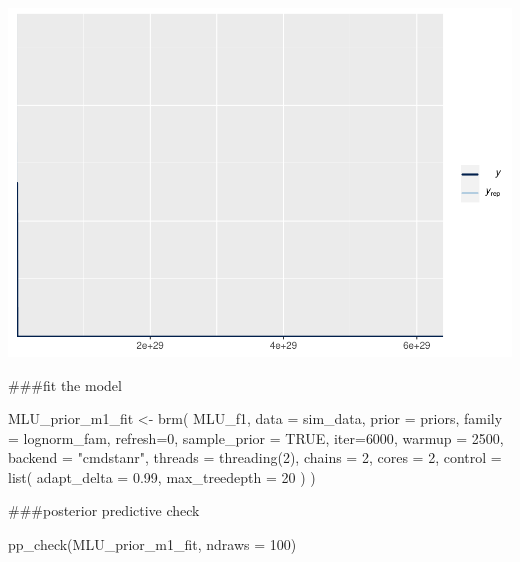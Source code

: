 \documentclass[
]{article}
\newenvironment{Shaded}{\begin{snugshade}}{\end{snugshade}}
\newcommand{\AttributeTok}[1]{\textcolor[rgb]{0.77,0.63,0.00}{#1}}
\newcommand{\ConstantTok}[1]{\textcolor[rgb]{0.00,0.00,0.00}{#1}}
\newcommand{\DecValTok}[1]{\textcolor[rgb]{0.00,0.00,0.81}{#1}}
\newcommand{\FloatTok}[1]{\textcolor[rgb]{0.00,0.00,0.81}{#1}}
\newcommand{\FunctionTok}[1]{\textcolor[rgb]{0.00,0.00,0.00}{#1}}
\newcommand{\NormalTok}[1]{#1}
\newcommand{\OtherTok}[1]{\textcolor[rgb]{0.56,0.35,0.01}{#1}}
\newcommand{\StringTok}[1]{\textcolor[rgb]{0.31,0.60,0.02}{#1}}
\begin{document}
\includegraphics{assignment_1_final_files/figure-latex/unnamed-chunk-9-1.pdf}

\#\#\#fit the model

\begin{Shaded}
\begin{Highlighting}[]
\NormalTok{MLU\_prior\_m1\_fit }\OtherTok{\textless{}{-}} \FunctionTok{brm}\NormalTok{(}
\NormalTok{  MLU\_f1, }
  \AttributeTok{data =}\NormalTok{ sim\_data, }
  \AttributeTok{prior =}\NormalTok{ priors,}
  \AttributeTok{family =}\NormalTok{ lognorm\_fam,}
  \AttributeTok{refresh=}\DecValTok{0}\NormalTok{,}
  \AttributeTok{sample\_prior =} \ConstantTok{TRUE}\NormalTok{,}
  \AttributeTok{iter=}\DecValTok{6000}\NormalTok{,}
  \AttributeTok{warmup =} \DecValTok{2500}\NormalTok{,}
  \AttributeTok{backend =} \StringTok{"cmdstanr"}\NormalTok{,}
  \AttributeTok{threads =} \FunctionTok{threading}\NormalTok{(}\DecValTok{2}\NormalTok{),}
  \AttributeTok{chains =} \DecValTok{2}\NormalTok{,}
  \AttributeTok{cores =} \DecValTok{2}\NormalTok{,}
  \AttributeTok{control =} \FunctionTok{list}\NormalTok{(}
    \AttributeTok{adapt\_delta =} \FloatTok{0.99}\NormalTok{,}
    \AttributeTok{max\_treedepth =} \DecValTok{20}
\NormalTok{)}
\NormalTok{)}
\end{Highlighting}
\end{Shaded}

\#\#\#posterior predictive check

\begin{Shaded}
\begin{Highlighting}[]
\FunctionTok{pp\_check}\NormalTok{(MLU\_prior\_m1\_fit, }\AttributeTok{ndraws =} \DecValTok{100}\NormalTok{)}
\end{Highlighting}
\end{Shaded}
\end{document}
